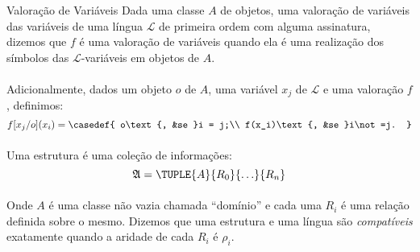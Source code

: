         \begin{definition}{Valoração de Variáveis}
                Dada uma classe $A$ de objetos, uma %
                valoração de variáveis das variáveis
                de uma língua $\mathcal{L}$ de
                primeira ordem com alguma assinatura,
                dizemos que $f$ é uma valoração de
                variáveis quando ela é uma realização
                dos símbolos das $\mathcal{L}$-variáveis
                em objetos de $A$. %
            \paragraph{}
                Adicionalmente, dados um objeto $o$
                de $A$, uma variável $x_j$ de
                $\mathcal{L}$ e uma valoração $f$,
                definimos:
                $$f[x_j\slash{o}](x_i) = \casedef{
                    o\text{, &se }i = j;\\
                    f(x_i)\text{, &se }i\not=j.
                }$$
        \end{definition}

        \paragraph{}
            Uma estrutura é uma coleção de informações:
            $$\mathfrak{A} = \TUPLE{A}{R_0}{\ldots}{R_n}$$
        \paragraph{}
            Onde $A$ é uma classe não vazia chamada ``domínio''
            e cada uma $R_i$ é uma relação definida
            sobre o mesmo. Dizemos que uma estrutura
            e uma língua são {\em compatíveis}
            exatamente quando a aridade de cada $R_i$
            é $\rho_i$. %

